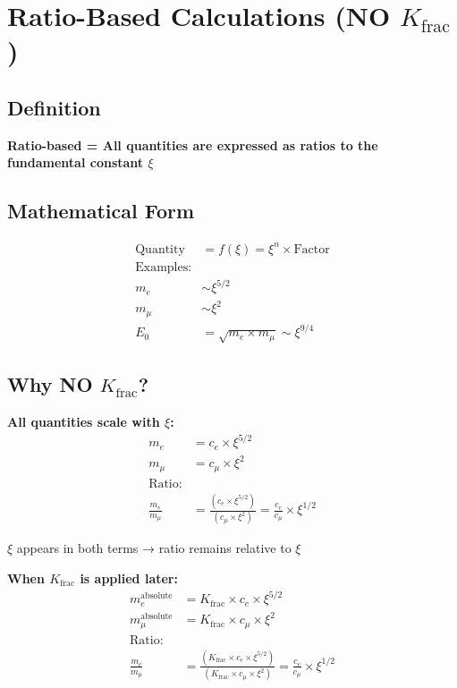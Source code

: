 \documentclass[12pt,a4paper]{article}
\begin{document}
	\section{Ratio-Based Calculations (NO $K_{\text{frac}}$)}
	
	\subsection{Definition}
	
	\textbf{Ratio-based = All quantities are expressed as ratios to the fundamental constant $\xi$}
	
	\subsection{Mathematical Form}
	\begin{align*}
		\text{Quantity} &= f(\xi) = \xi^n \times \text{Factor} \\
		\text{Examples:} & \\
		m_e &\sim \xi^{5/2} \\
		m_μ &\sim \xi^2 \\
		E_0 &= \sqrt{m_e \times m_μ} \sim \xi^{9/4}
	\end{align*}
	
	\subsection{Why NO $K_{\text{frac}}$?}
	
	\textbf{All quantities scale with $\xi$:}
	\begin{align*}
		m_e &= c_e \times \xi^{5/2} \\
		m_μ &= c_μ \times \xi^2 \\
		\text{Ratio:} & \\
		\frac{m_e}{m_μ} &= \frac{(c_e \times \xi^{5/2})}{(c_μ \times \xi^2)} = \frac{c_e}{c_μ} \times \xi^{1/2}
	\end{align*}
	
	$\xi$ appears in both terms → ratio remains relative to $\xi$
	
	\textbf{When $K_{\text{frac}}$ is applied later:}
	\begin{align*}
		m_e^{\text{absolute}} &= K_{\text{frac}} \times c_e \times \xi^{5/2} \\
		m_μ^{\text{absolute}} &= K_{\text{frac}} \times c_μ \times \xi^2 \\
		\text{Ratio:} & \\
		\frac{m_e}{m_μ} &= \frac{(K_{\text{frac}} \times c_e \times \xi^{5/2})}{(K_{\text{frac}} \times c_μ \times \xi^2)} = \frac{c_e}{c_μ} \times \xi^{1/2}
	\end{align*}
	
\end{document}
